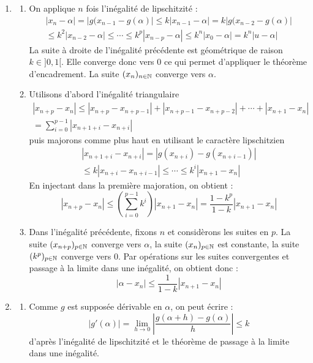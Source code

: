 \begin{enumerate}
\item
\begin{enumerate}
 \item On applique $n$ fois l'inégalité de lipschitzité :
\begin{multline*}
 |x_n - \alpha| = |g(x_{n-1} - g(\alpha)|\leq k |x_{n-1}-\alpha|=  k|g(x_{n-2} - g(\alpha)| \\ 
\leq k^2 |x_{n-2}-\alpha| \leq \cdots \leq  k^p |x_{n-p}-\alpha| \leq k^n |x_{0}-\alpha| = k^n|u-\alpha|
\end{multline*}
La suite à droite de l'inégalité précédente est géométrique de raison $k \in]0,1[$. Elle converge donc vers $0$ ce qui permet d'appliquer le théorème d'encadrement. La suite $(x_n)_{n\in \mathbb{N}}$ converge vers $\alpha$.
\item Utilisons d'abord l'inégalité triangulaire 
\begin{multline*}
 |x_{n+p}-x_n|\leq |x_{n+p}-x_{n+p-1}|+ |x_{n+p-1}-x_{n+p-2}|+ \cdots +|x_{n+1}-x_{n}|\\
=\sum_{i=0}^{p-1}|x_{n+1+i}-x_{n+i}|
\end{multline*}
puis majorons comme plus haut en utilisant le caractère lipschitzien
\begin{multline*}
 |x_{n+1+i}-x_{n+i}|=|g(x_{n+i})-g(x_{n+i-1})|\\
 \leq k |x_{n+i}-x_{n+i-1}| \leq \cdots \leq k^i |x_{n+1}-x_{n}|
\end{multline*}
En injectant dans la première majoration, on obtient :
\begin{displaymath}
 |x_{n+p}-x_n|\leq \left(\sum_{i=0}^{p-1}k^i\right) |x_{n+1}-x_{n}| = \frac{1-k^p}{1-k}|x_{n+1}-x_{n}|
\end{displaymath}

\item Dans l'inégalité précédente, fixons $n$ et considèrons les suites en $p$.\newline
La suite $(x_{n+p})_{p\in \mathbb{N}}$ converge vers  $\alpha$, la suite $(x_{n})_{p\in \mathbb{N}}$ est constante, la suite $(k^p)_{p\in \mathbb{N}}$ converge vers 0. Par opérations sur les suites convergentes et passage à la limite dans une inégalité, on obtient donc :
\begin{displaymath}
 |\alpha - x_n|\leq \frac{1}{1-k}|x_{n+1}-x_{n}|
\end{displaymath}
\end{enumerate}

\item \begin{enumerate}
 \item Comme $g$ est supposée dérivable en $\alpha$, on peut écrire :
\begin{displaymath}
 |g'(\alpha)| =  \lim_{h\rightarrow 0} \left|\frac{g(\alpha +h) -g(\alpha)}{h}\right|\leq k
\end{displaymath}
d'après l'inégalité de lipschitzité et le théorème de passage à la limite dans une inégalité.


\end{enumerate}
\end{enumerate}
